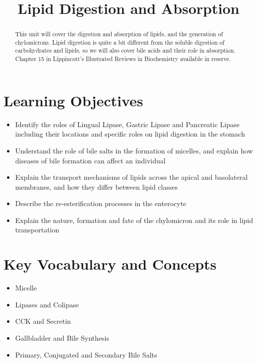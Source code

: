 \documentclass{tufte-handout}
\title{Lipid Digestion and Absorption}
\author{}
\date{}  %
\begin{document}
\maketitle%

\begin{abstract}
\noindent This unit will cover the digestion and absorption of lipids, and the generation of chylomicrons.  Lipid digestion is quite a bit different from the soluble digestion of carbohydrates and lipids, so we will also cover bile acids and their role in absorption.  Chapter 15 in Lippincott's Illustrated Reviews in Biochemistry available in reserve\cite{Ferrier2017}.
\end{abstract}

\tableofcontents

\pagebreak
\section{Learning Objectives}

\begin{itemize}
\item Identify the roles of Lingual Lipase, Gastric Lipase and Pancreatic Lipase including their locations and specific roles on lipid digestion in the stomach
\item Understand the role of bile salts in the formation of micelles, and explain how diseases of bile formation can affect an individual
\item Explain the transport mechanisms of lipids across the apical and basolateral membranes, and how they differ between lipid classes
\item Describe the re-esterification processes in the enterocyte
\item Explain the nature, formation and fate of the chylomicron and its role in lipid transportation
\end{itemize}

\section{Key Vocabulary and Concepts}
\begin{itemize}
	\item Micelle
	\item Lipases and Colipase
	\item CCK and Secretin 
	\item Gallbladder and Bile Synthesis
	\item Primary, Conjugated and Secondary Bile Salts
\end{itemize}
\end{document}
